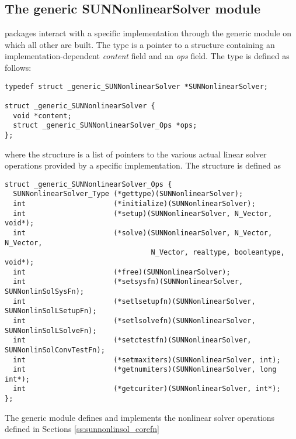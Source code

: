 \subsection{The generic SUNNonlinearSolver module}
\label{ss:sunnonlinsol_generic}

{\sundials} packages interact with a specific {\sunnonlinsol}
implementation through the generic {\sunnonlinsol} module on which all
other {\sunnonlinsol} are built. The  type is
a pointer to a structure containing an implementation-dependent
\textit{content} field and an \textit{ops} field. The type
 is defined as follows:
\begin{verbatim}
typedef struct _generic_SUNNonlinearSolver *SUNNonlinearSolver;

struct _generic_SUNNonlinearSolver {
  void *content;
  struct _generic_SUNNonlinearSolver_Ops *ops;
};
\end{verbatim}
where the  structure is a list of 
pointers to the various actual linear solver operations provided by a
specific implementation. The 
structure is defined as
\begin{verbatim}
struct _generic_SUNNonlinearSolver_Ops {
  SUNNonlinearSolver_Type (*gettype)(SUNNonlinearSolver);
  int                     (*initialize)(SUNNonlinearSolver);
  int                     (*setup)(SUNNonlinearSolver, N_Vector, void*);
  int                     (*solve)(SUNNonlinearSolver, N_Vector, N_Vector,
                                   N_Vector, realtype, booleantype, void*);
  int                     (*free)(SUNNonlinearSolver);
  int                     (*setsysfn)(SUNNonlinearSolver, SUNNonlinSolSysFn);
  int                     (*setlsetupfn)(SUNNonlinearSolver, SUNNonlinSolLSetupFn);
  int                     (*setlsolvefn)(SUNNonlinearSolver, SUNNonlinSolLSolveFn);
  int                     (*setctestfn)(SUNNonlinearSolver, SUNNonlinSolConvTestFn);
  int                     (*setmaxiters)(SUNNonlinearSolver, int);
  int                     (*getnumiters)(SUNNonlinearSolver, long int*);
  int                     (*getcuriter)(SUNNonlinearSolver, int*);
};
\end{verbatim}
The generic {\sunnonlinsol} module defines and implements the nonlinear
solver operations defined in Sections \ref{ss:sunnonlinsol_corefn}
